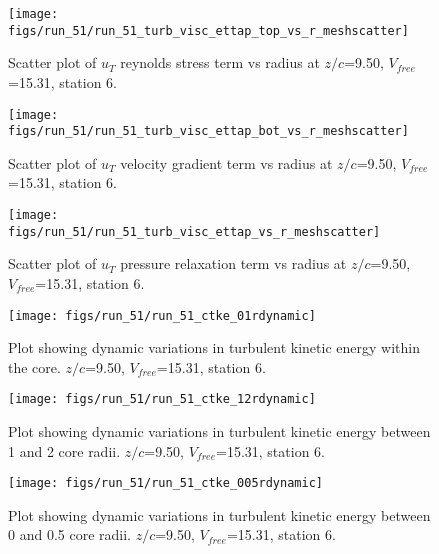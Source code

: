 \begin{figure}[H]
\centering
\texttt{[image: figs/run\_51/run\_51\_turb\_visc\_ettap\_top\_vs\_r\_meshscatter]}
\caption{Scatter plot of $
u_T$ reynolds stress term vs radius at $z/c$=9.50, $V_{free}$=15.31, station 6.}
\label{fig:run_51_turb_visc_ettap_top_vs_r_meshscatter}
\end{figure}


\begin{figure}[H]
\centering
\texttt{[image: figs/run\_51/run\_51\_turb\_visc\_ettap\_bot\_vs\_r\_meshscatter]}
\caption{Scatter plot of $
u_T$ velocity gradient term vs radius at $z/c$=9.50, $V_{free}$=15.31, station 6.}
\label{fig:run_51_turb_visc_ettap_bot_vs_r_meshscatter}
\end{figure}


\begin{figure}[H]
\centering
\texttt{[image: figs/run\_51/run\_51\_turb\_visc\_ettap\_vs\_r\_meshscatter]}
\caption{Scatter plot of $
u_T$ pressure relaxation term vs radius at $z/c$=9.50, $V_{free}$=15.31, station 6.}
\label{fig:run_51_turb_visc_ettap_vs_r_meshscatter}
\end{figure}


\begin{figure}[H]
\centering
\texttt{[image: figs/run\_51/run\_51\_ctke\_01rdynamic]}
\caption{Plot showing dynamic variations in turbulent kinetic energy within the core. $z/c$=9.50, $V_{free}$=15.31, station 6.}
\label{fig:run_51_ctke_01rdynamic}
\end{figure}


\begin{figure}[H]
\centering
\texttt{[image: figs/run\_51/run\_51\_ctke\_12rdynamic]}
\caption{Plot showing dynamic variations in turbulent kinetic energy between 1 and 2 core radii. $z/c$=9.50, $V_{free}$=15.31, station 6.}
\label{fig:run_51_ctke_12rdynamic}
\end{figure}


\begin{figure}[H]
\centering
\texttt{[image: figs/run\_51/run\_51\_ctke\_005rdynamic]}
\caption{Plot showing dynamic variations in turbulent kinetic energy between 0 and 0.5 core radii. $z/c$=9.50, $V_{free}$=15.31, station 6.}
\label{fig:run_51_ctke_005rdynamic}
\end{figure}


